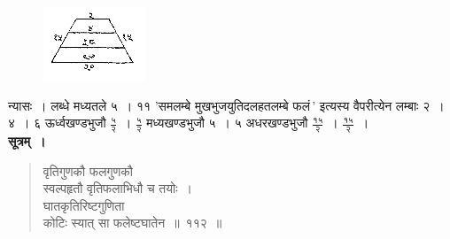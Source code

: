 \documentclass[11pt, openany]{book}
\begin{document}
\begin{figure}[h!]
     \centering
     \includegraphics[scale=0.85]{graphics/capture129.png}
\end{figure} 
\vspace{-2mm}

 न्यासः~। लब्धे मध्यतले ५~। ११ 'समलम्बे मुखभुजयुतिदलहतलम्बे फलं\textendash\,' इत्यस्य वैपरीत्येन लम्बाः २~। ४~। ६ ऊर्ध्वखण्डभुजौ $\frac{\mbox{५}}{\mbox{२}}$~। $\frac{\mbox{५}}{\mbox{२}}$ मध्यखण्डभुजौ ५~। ५ अधरखण्डभुजौ $\frac{\mbox{१५}}{\mbox{२}}$~। $\frac{\mbox{१५}}{\mbox{२}}$~।\\

\vspace{-2mm}
 \textbf{सूत्रम्~।} 
 \begin{quote}
     \bs 
     वृतिगुणकौ फलगुणकौ\\
स्वल्पहृतौ वृतिफलाभिधौ च तयोः~। \\
घातकृतिरिष्टगुणिता\\
कोटिः स्यात् सा फलेष्टघातेन~॥~११२~॥~
 \end{quote}

\newpage%
\end{document}
